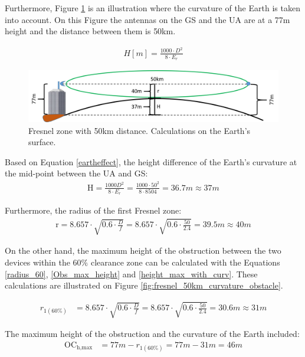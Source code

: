 Furthermore, Figure \ref{fig:fresnel_50km_curvature} is an illustration where the curvature of the Earth is taken into account. On this Figure the antennas on the GS and the UA are at a 77m height and the distance between them is 50km. 

\begin{align}
H [m] = \frac{1000\cdot D^2}{8\cdot E_r}\label{eartheffect}
\end{align}

\begin{figure}[H]
	\centering
	\includegraphics[scale=0.50]{figures/fresnel_50km_curvature.png}
	\caption{Fresnel zone with 50km distance. Calculations on the Earth's surface.}
	\label{fig:fresnel_50km_curvature}
\end{figure}

Based on Equation \ref{eartheffect}, the height difference of the Earth's curvature at the mid-point between the UA and GS:
\begin{align}
\text{H} = \frac{1000 D^2}{8 \cdot E_r} = \frac{1000 \cdot 50^2}{8\cdot 8504} = 36.7m \approx 37m 
\end{align}

Furthermore, the radius of the first Fresnel zone:
\begin{align*}
\text{r} = 8.657\cdot \sqrt{0.6\cdot\frac{D}{f}} = 8.657\cdot \sqrt{0.6\cdot\frac{50}{2.4}} = 39.5m \approx 40m 
\end{align*}

On the other hand, the maximum height of the obstruction between the two devices within the 60$\%$ clearance zone can be calculated with the Equations \ref{radius_60}, \ref{Obs_max_height} and \ref{height_max_with_curv}. These calculations are illustrated on Figure \ref{fig:fresnel_50km_curvature_obstacle}.

\begin{align}
r_{1(60\%)} &= 8.657\cdot \sqrt{0.6\cdot\frac{D}{f}} = 8.657\cdot \sqrt{0.6\cdot\frac{50}{2.4}} = 30.6m \approx 31m \label{radius_60}
\end{align}

The maximum height of the obstruction and the curvature of the Earth included:
\begin{align}
\text{OC}_{\text{h,max}} &= 77m - r_{1(60\%)} = 77m - 31m = 46m \label{Obs_max_height}
\end{align}

